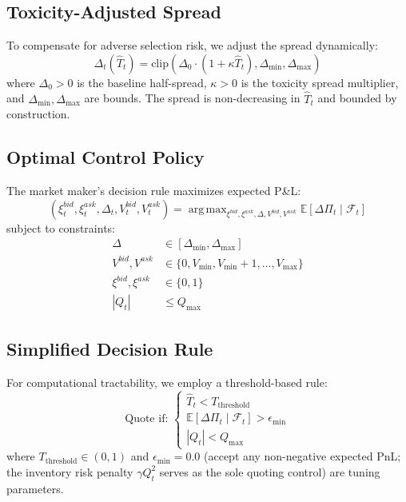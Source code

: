 \documentclass[11pt]{article}
\DeclareMathOperator*{\argmax}{arg\,max}
\theoremstyle{definition}
\begin{document}
\subsection{Toxicity-Adjusted Spread}

To compensate for adverse selection risk, we adjust the spread dynamically:
\begin{equation}
\Delta_t(\hat{T}_t) = \text{clip}\left(\Delta_0 \cdot (1 + \kappa \hat{T}_t), \Delta_{\min}, \Delta_{\max}\right)
\end{equation}
where $\Delta_0 > 0$ is the baseline half-spread, $\kappa > 0$ is the toxicity spread multiplier, and $\Delta_{\min}, \Delta_{\max}$ are bounds. The spread is non-decreasing in $\hat{T}_t$ and bounded by construction.

\subsection{Optimal Control Policy}

The market maker's decision rule maximizes expected P\&L:
\begin{equation}
(\xi_t^{bid}, \xi_t^{ask}, \Delta_t, V_t^{bid}, V_t^{ask}) = \argmax_{\xi^{bid}, \xi^{ask}, \Delta, V^{bid}, V^{ask}} \mathbb{E}[\Delta \Pi_t \mid \mathcal{F}_t]
\end{equation}
subject to constraints:
\begin{align}
\Delta &\in [\Delta_{\min}, \Delta_{\max}] \\
V^{bid}, V^{ask} &\in \{0, V_{\min}, V_{\min}+1, \ldots, V_{\max}\} \\
\xi^{bid}, \xi^{ask} &\in \{0, 1\} \\
|Q_t| &\leq Q_{\max}
\end{align}

\subsection{Simplified Decision Rule}

For computational tractability, we employ a threshold-based rule:
\begin{equation}
\text{Quote if: } \begin{cases}
\hat{T}_t < T_{\text{threshold}} \\
\mathbb{E}[\Delta \Pi_t \mid \mathcal{F}_t] > \epsilon_{\text{min}} \\
|Q_t| < Q_{\max}
\end{cases}
\end{equation}
where $T_{\text{threshold}} \in (0,1)$ and $\epsilon_{\text{min}} = 0.0$ (accept any non-negative expected PnL; the inventory risk penalty $\gamma Q_t^2$ serves as the sole quoting control) are tuning parameters.
\end{document}
